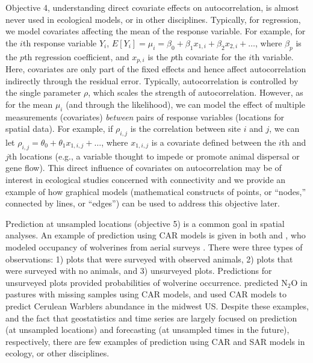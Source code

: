 \documentclass[11pt, titlepage]{article}\usepackage[]{graphicx}\usepackage[]{color}
\begin{document}
\begin{spacing}{1.9}
\begin{flushleft}
Objective 4, understanding direct covariate effects on autocorrelation, is almost never used in ecological models, or in other disciplines. Typically, for regression, we model covariates affecting the mean of the response variable. For example, for the $i$th response variable $Y_i$, $E[Y_i] = \mu_i = \beta_0 + \beta_1 x_{1,i} + \beta_2 x_{2,i} + \ldots$, where $\beta_p$ is the $p$th regression coefficient, and $x_{p,i}$ is the $p$th covariate for the $i$th variable. Here, covariates are only part of the fixed effects and hence affect autocorrelation indirectly through the residual error. Typically, autocorrelation is controlled by the single parameter $\rho$, which scales the strength of autocorrelation. However, as for the mean $\mu_i$ (and through the likelihood), we can model the effect of multiple measurements (covariates) \emph{between} pairs of response variables (locations for spatial data).  For example, if $\rho_{i,j}$ is the correlation between site $i$ and $j$, we can let $\rho_{i,j} = \theta_0 + \theta_1 x_{1,i,j} + \ldots$, where $x_{1,i,j}$ is a covariate defined between the $i$th and $j$th locations (e.g., a variable thought to impede or promote animal dispersal or gene flow). This direct influence of covariates on autocorrelation may be of interest in ecological studies concerned with connectivity \citep[for a landscape-genetic example, see][]{Hank:Hoot:circ:2013} and we provide an example of how graphical models (mathematical constructs of points, or ``nodes,'' connected by lines, or ``edges'') can be used to address this objective later. 

Prediction at unsampled locations (objective 5) is a common goal in spatial analyses.  An example of prediction using CAR models is given in both \citet{Mago:Ray:John:Valk:Daws:Bowm:mode:2007} and \citet{Gard:Lawl:Ver:Mago:Kell:coar:2010}, who modeled occupancy of wolverines from aerial surveys \citep[also see][]{John:Conn:Hoot:Ray:Pond:spat:2013}. There were three types of observations: 1) plots that were surveyed with observed animals, 2) plots that were surveyed with no animals, and 3) unsurveyed plots.  Predictions for unsurveyed plots provided probabilities of wolverine occurrence. \citet{Huan:Grac:Hu:Rowl:Meng:spat:2013} predicted N$_2$O in pastures with missing samples using CAR models, and \citet{Thog:Saue:Knut:hier:2004} used CAR models to predict Cerulean Warblers abundance in the midwest US. Despite these examples, and the fact that geostatistics and time series are largely focused on prediction (at unsampled locations) and forecasting (at unsampled times in the future), respectively, there are few examples of prediction using CAR and SAR models in ecology, or other disciplines.


\end{flushleft}
\end{spacing}
\end{document}
